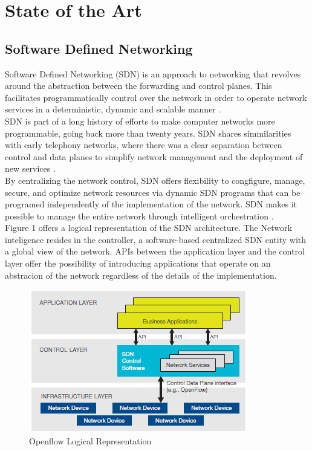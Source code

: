 \chapter{State of the Art}\label{sec:chap:2}

\section{Software Defined Networking}\label{sec:chap2_sdn}

Software Defined Networking (SDN) is an approach to networking that revolves around the abstraction between the forwarding and control planes. This facilitates programmatically control over the network in order to operate network services in a deterministic, dynamic and scalable manner \cite{rfc_7426}.\\

SDN is part of a long history of efforts to make computer networks more programmable, going back more than twenty years. SDN shares simmilarities with early telephony networks, where there was a clear separation between control and data planes to simplify network management and the deployment of new services \cite{road_to_sdn}.\\

By centralizing the network control, SDN offers flexibility to congfigure, manage, secure, and optimize network resources via dynamic SDN programs that can be programed independently of the implementation of the network. SDN makes it possible to manage the entire network through intelligent orchestration \cite{new_norm_sdn}.\\

Figure 1 offers a logical representation of the SDN architecture. The Network inteligence resides in the controller, a software-based centralized SDN entity with a global view of the network. APIs between the application layer and the control layer offer the possibility of introducing applications that operate on an abstracion of the network regardless of the details of the implementation.

\begin{center}
\begin{figure}[h!]
  \centering
    \includegraphics[scale=0.9]{./images/openflowjason}
	\caption{Openflow Logical Representation}
	\label{openflow-fig}
\end{figure}
\end{center}

